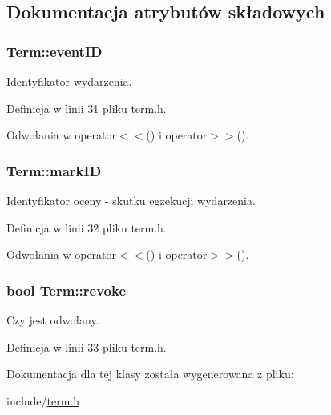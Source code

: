 \subsection{Dokumentacja atrybutów składowych}
\hypertarget{classTerm_acc86c9d25865449a551947aa1597dec5}{
\subsubsection[{eventID}]{ {\bf Term::eventID}}}
\label{classTerm_acc86c9d25865449a551947aa1597dec5}


Identyfikator wydarzenia. 



Definicja w linii 31 pliku term.h.



Odwołania w operator$<$$<$() i operator$>$$>$().

\hypertarget{classTerm_a59508892d24fb82de0db91a377c690fb}{
\subsubsection[{markID}]{ {\bf Term::markID}}}
\label{classTerm_a59508892d24fb82de0db91a377c690fb}


Identyfikator oceny -\/ skutku egzekucji wydarzenia. 



Definicja w linii 32 pliku term.h.



Odwołania w operator$<$$<$() i operator$>$$>$().

\hypertarget{classTerm_a58a815dca7217ba0e9e4e084d7c91648}{
\subsubsection[{revoke}]{\setlength{\rightskip}{0pt plus 5cm}bool {\bf Term::revoke}}}
\label{classTerm_a58a815dca7217ba0e9e4e084d7c91648}


Czy jest odwołany. 



Definicja w linii 33 pliku term.h.



Dokumentacja dla tej klasy została wygenerowana z pliku:\begin{DoxyCompactItemize}
\item 
include/\hyperlink{term_8h}{term.h}\end{DoxyCompactItemize}
